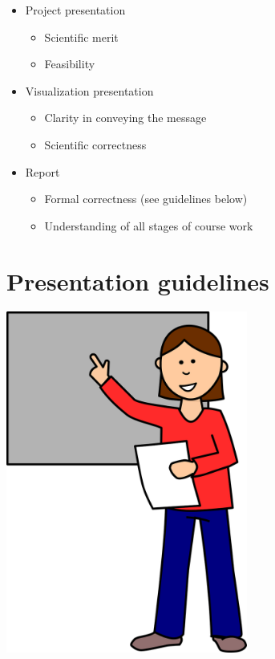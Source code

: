 \documentclass[
  letterpaper,
]{report}
\providecommand{\tightlist}{%
  \setlength{\itemsep}{0pt}\setlength{\parskip}{0pt}}\usepackage{longtable,booktabs,array}
\begin{document}
\begin{itemize}
\item
  Project presentation

  \begin{itemize}
  \item
    Scientific merit
  \item
    Feasibility
  \end{itemize}
\item
  Visualization presentation

  \begin{itemize}
  \tightlist
  \item
    Clarity in conveying the message
  \item
    Scientific correctness
  \end{itemize}
\item
  Report

  \begin{itemize}
  \item
    Formal correctness (see guidelines below)
  \item
    Understanding of all stages of course work
  \end{itemize}
\end{itemize}

\section*{Presentation guidelines}\label{sec-presentation-guidelines}


\includegraphics[width=3.125in,height=\textheight,keepaspectratio]{images/classroom-1297780_1280.png}
\end{document}
